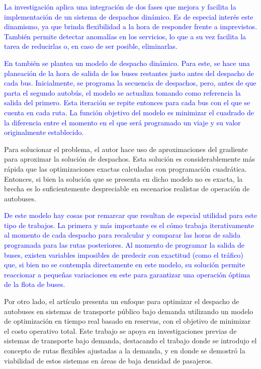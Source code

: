 \documentclass[preprint,11pt]{elsarticle}
\newcommand{\Blue}[1]{\textcolor{blue}{#1}}
\begin{document}
\Blue{La investigación aplica una integración de dos fases que mejora y facilita la implementación de un sistema de despachos dinámico. Es de especial interés este dinamismo, ya que brinda flexibilidad a la hora de responder frente a imprevistos. También permite detectar anomalías en los servicios, lo que a su vez facilita la tarea de reducirlas o, en caso de ser posible, eliminarlas.}

\Blue{En \parencite{gkiotsalitis2020} también se plantea un modelo de despacho dinámico. Para este, se hace una planeación de la hora de salida de los buses restantes justo antes del despacho de cada bus. Inicialmente, se programa la secuencia de despachos, pero, antes de que parta el segundo autobús, el modelo se actualiza tomando como referencia la salida del primero. Esta iteración se repite entonces para cada bus con el que se cuenta en cada ruta. La función objetivo del modelo es minimizar  el cuadrado de la diferencia entre el momento en el que será programado un viaje y su valor originalmente establecido.}

Para solucionar el problema, el autor hace uso de aproximaciones del gradiente para aproximar la solución de despachos. Esta solución es considerablemente más rápida que las optimizaciones exactas calculadas con programación cuadrática. Entonces, si bien la solución que se presenta en dicho modelo no es exacta, la brecha es lo suficientemente despreciable en escenarios realistas de operación de autobuses.

\Blue{De este modelo hay cosas por remarcar que resultan de especial utilidad para este tipo de trabajos. La primera y más importante es el cómo trabaja iterativamente al momento de cada despacho para recalcular y comparar las horas de salida programada para las rutas posteriores. Al momento de programar la salida de buses, existen variables imposibles de predecir con exactitud (como el tráfico) que, si bien no se contempla directamente en este modelo, su solución permite reaccionar a pequeñas variaciones en este para garantizar una operación óptima de la flota de buses.}

Por otro lado, el artículo \parencite{zhou2023} presenta un enfoque para optimizar el despacho de autobuses en sistemas de transporte público bajo demanda utilizando un modelo de optimización en tiempo real basado en reservas, con el objetivo de minimizar el costo operativo total. Este trabajo se apoya en investigaciones previas de sistemas de transporte bajo demanda, destacando el trabajo \cite{daganzo1984} donde se introdujo el concepto de rutas flexibles ajustadas a la demanda, y en \cite{gorev2020} donde se demostró la viabilidad de estos sistemas en áreas de baja densidad de pasajeros.
\end{document}
